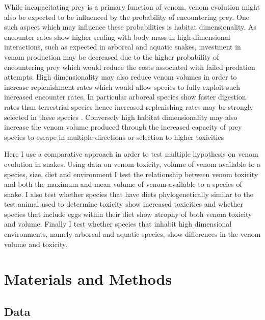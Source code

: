 While incapacitating prey is a primary function of venom, venom evolution might also be expected to be influenced by the probability of encountering prey. One such aspect which may influence these probabilities is habitat dimensionality. As encounter rates show higher scaling with body mass in high dimensional interactions, such as expected in arboreal and aquatic snakes, investment in venom production may be decreased due to the higher probability of encountering prey which would reduce the costs associated with failed predation attempts. High dimensionality may also reduce venom volumes in order to increase replenishment rates which would allow species to fully exploit such increased encounter rates. In particular arboreal species show faster digestion rates than terrestrial species hence increased replenishing rates may be strongly selected in these species \citep{lillywhite2002patterns}. Conversely high habitat dimensionality may also increase the venom volume produced through the increased capacity of prey species to escape in multiple directions or selection to higher toxicities \citep{healy2014ecology,moller2010up} 

Here I use a comparative approach in order to test multiple hypothesis on venom evolution in snakes. Using data on venom toxicity, volume of venom available to a species, size, diet and environment I test the relationship between venom toxicity and both the maximum and mean volume of venom available to a species of snake. I also test whether species that have diets phylogenetically similar to the test animal used to determine toxicity show increased toxicities and whether species that include eggs within their diet show atrophy of both venom toxicity and volume. Finally I test whether species that inhabit high dimensional environments, namely arboreal and aquatic species, show differences in the venom volume and toxicity.

\section{Materials and Methods}
\subsection{Data}

